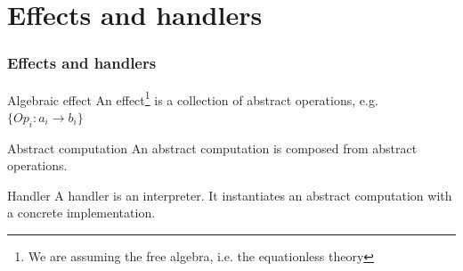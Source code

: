 \section{Effects and handlers}
\begin{frame}
  \frametitle{Effects and handlers}
  \begin{block}{Algebraic effect}
    An effect\footnote{We are assuming the free algebra, i.e. the equationless theory} is a collection of abstract operations, e.g. 
    $\{ Op_i : a_i \to b_i \}$
  \end{block}
  \begin{block}{Abstract computation}
    An abstract computation is composed from abstract operations.
  \end{block}

  \begin{block}{Handler}
    A handler is an interpreter. It instantiates an abstract computation with a concrete implementation.
  \end{block}
\end{frame}

